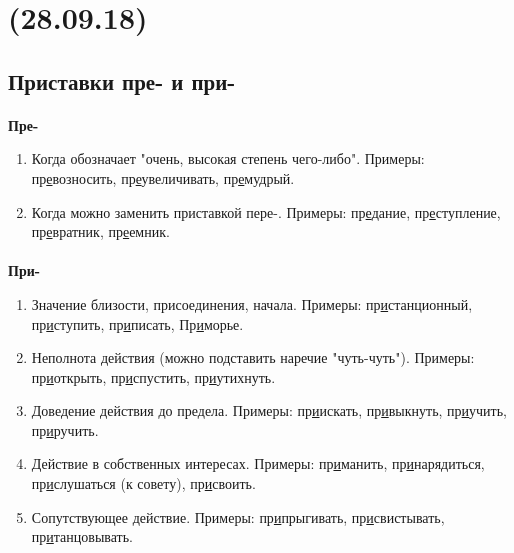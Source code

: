 \documentclass{article}
\begin{document}
\newpage
\noindent\makebox[\linewidth]{\rule{\paperwidth}{0.4pt}}
\section{(28.09.18)}
\noindent\makebox[\linewidth]{\rule{\paperwidth}{0.4pt}}

\subsection{Приставки пре- и при-}
\paragraph{}

\textbf{Пре-}
\begin{enumerate}
\item
  Когда обозначает "очень, высокая степень чего-либо". Примеры: пр\underline{е}возносить,
  пр\underline{е}увеличивать, пр\underline{е}мудрый.
\item
  Когда можно заменить приставкой пере-. Примеры: пр\underline{е}дание, пр\underline{е}ступление,
  пр\underline{е}вратник, пр\underline{е}емник.
\end{enumerate}
\paragraph{}

\textbf{При-}
\begin{enumerate}
\item
  Значение близости, присоединения, начала. Примеры: пр\underline{и}станционный, пр\underline{и}ступить,
  пр\underline{и}писать, Пр\underline{и}морье.
\item
  Неполнота действия (можно подставить наречие "чуть-чуть"). Примеры: пр\underline{и}открыть,
  пр\underline{и}спустить, пр\underline{и}утихнуть.
\item
  Доведение действия до предела. Примеры: пр\underline{и}искать, пр\underline{и}выкнуть,
  пр\underline{и}учить, пр\underline{и}ручить.
\item
  Действие в собственных интересах. Примеры: пр\underline{и}манить, пр\underline{и}нарядиться,
  пр\underline{и}слушаться (к совету), пр\underline{и}своить.
\item
  Сопутствующее действие. Примеры: пр\underline{и}прыгивать, пр\underline{и}свистывать,
  пр\underline{и}танцовывать.
\end{enumerate}
\paragraph{}
\end{document}
